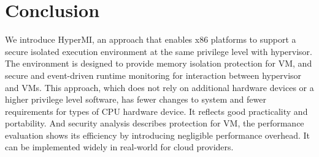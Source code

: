 \documentclass[conference]{IEEEtran}
\begin{document}
\section{Conclusion}
We introduce HyperMI, an approach that enables x86 platforms to support a secure isolated execution environment at the same privilege level with hypervisor. The environment is designed to provide memory isolation protection for VM, and secure and event-driven runtime monitoring for interaction between hypervisor and VMs. This approach, which does not rely on additional hardware devices or a higher privilege level software, has fewer changes to system and fewer requirements for types of CPU hardware device. It reflects good practicality and portability. And security analysis describes protection for VM, the performance evaluation shows its efficiency by introducing negligible performance overhead. It can be implemented widely in real-world for cloud providers.


 

\end{document}
